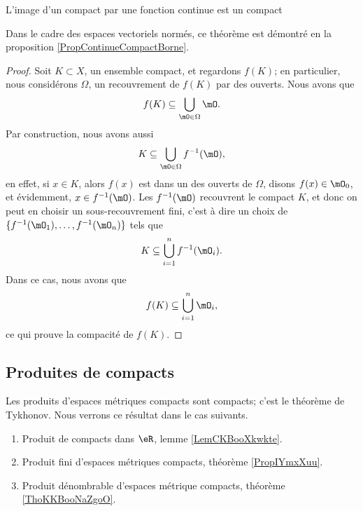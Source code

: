 \begin{theorem}     \label{ThoImCompCotComp}
L'image d'un compact par une fonction continue est un compact
\end{theorem}
Dans le cadre des espaces vectoriels normés, ce théorème est démontré en la proposition \ref{PropContinueCompactBorne}.

\begin{proof}
    Soit $K\subset X$, un ensemble compact, et regardons $f(K)$; en particulier, nous considérons $\Omega$, un recouvrement de $f(K)$ par des ouverts. Nous avons que
    \begin{equation}
        f(K)\subseteq\bigcup_{\mO\in\Omega}\mO.
    \end{equation}
    Par construction, nous avons aussi
    \begin{equation}
        K\subseteq\bigcup_{\mO\in\Omega}f^{-1}(\mO),
    \end{equation}
    en effet, si $x\in K$, alors $f(x)$ est dans un des ouverts de $\Omega$, disons $f(x)\in \mO_0$, et évidemment, $x\in f^{-1}(\mO)$.  Les $f^{-1}(\mO)$ recouvrent le compact $K$, et donc on peut en choisir un sous-recouvrement fini, c'est à dire un choix de $\{ f^{-1}(\mO_1),\ldots,f^{-1}(\mO_n) \}$ tels que
    \begin{equation}
        K\subseteq \bigcup_{i=1}^nf^{-1}(\mO_i).
    \end{equation}
    Dans ce cas, nous avons que
    \begin{equation}
        f(K)\subseteq\bigcup_{i=1}^n\mO_i,
    \end{equation}
    ce qui prouve la compacité de $f(K)$.
\end{proof}

\subsection{Produites de compacts}

Les produits d'espaces métriques compacts sont compacts; c'est le théorème de Tykhonov. Nous verrons ce résultat dans le cas suivants.
\begin{enumerate}
    \item
        Produit de compacts dans \( \eR\), lemme \ref{LemCKBooXkwkte}.
    \item
        Produit fini d'espaces métriques compacts, théorème \ref{PropIYmxXuu}.
    \item
        Produit dénombrable d'espaces métrique compacts, théorème \ref{ThoKKBooNaZgoO}.
\end{enumerate}


